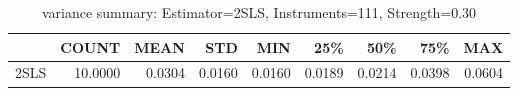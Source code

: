 \begin{table}[ht]
\centering
\caption{variance summary: Estimator=2SLS, Instruments=111, Strength=0.30}
\begin{tabular}{lrrrrrrrr}
\toprule
 & COUNT & MEAN & STD & MIN & 25\% & 50\% & 75\% & MAX \\
\midrule
2SLS & 10.0000 & 0.0304 & 0.0160 & 0.0160 & 0.0189 & 0.0214 & 0.0398 & 0.0604 \\
\bottomrule
\end{tabular}
\end{table}
